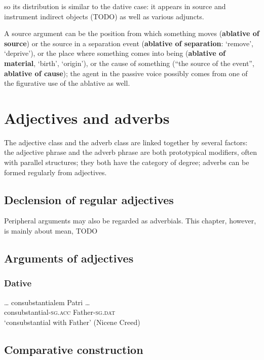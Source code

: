 \documentclass[a4paper, oneside, 12pt]{report}
\newcommand*{\concept}[1]{\textbf{#1}}
\newcommand*{\category}[1]{\textsc{#1}}
\newcommand{\translate}[1]{`#1'}
\begin{document}
so its distribution is similar to the dative case: 
it appears in source and instrument indirect objects (TODO) 
as well as various adjuncts.

A source argument
can be the position from which something moves 
(\concept{ablative of source})
or the source in a separation event 
(\concept{ablative of separation}: \translate{remove}, \translate{deprive}),
or the place where something comes into being 
(\concept{ablative of material}, \translate{birth}, \translate{origin}), 
or the cause of something (``the source of the event'', \concept{ablative of cause});
the agent in the passive voice possibly 
comes from one of the figurative use of the ablative as well.

\chapter{Adjectives and adverbs}

The adjective class and the adverb class are linked together by several factors:
the adjective phrase and the adverb phrase are both prototypical modifiers,
often with parallel structures;
they both have the category of degree; 
adverbs can be formed regularly from adjectives.

\section{Declension of regular adjectives}

Peripheral arguments may also be regarded as adverbials.
This chapter, however, is mainly about mean, TODO

\section{Arguments of adjectives}

\subsection{Dative}

\begin{exe}
    \ex \gll \dots {} consubstantialem Patri \dots \\
    {} consubstantial-\category{sg.acc} Father-\category{sg.dat} \\
    \glt \translate{consubstantial with Father} (Nicene Creed)
\end{exe}

\section{Comparative construction}
\end{document}
